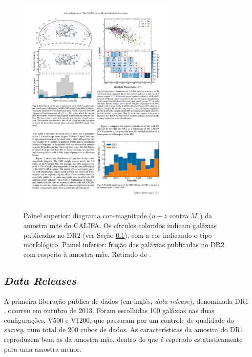 \begin{figure}
	\includegraphics[width=0.7\textwidth]{figuras/CALIFACMD}
	\caption[Diagrama cor--magnitude da amostra mãe do CALIFA]
	{Painel superior: diagrama cor--magnitude ($u-z$ contra $M_z$) da amostra mãe
	do CALIFA. Os círculos coloridos indicam galáxias publicadas no DR2 (ver Seção
	\ref{sec:ifs:dr}), com a cor indicando o tipo morfológico. Painel inferior:
	fração das galáxias publicadas no DR2 com respeito à amostra mãe. Retirado de
	\citet{GarciaBenito2015}.}
	\label{fig:CALIFACMD}
\end{figure}


\subsection{{\em Data Releases}}
\label{sec:ifs:dr}

A primeira liberação pública de dados (em inglês, {\em data release}),
denominada DR1 \citep{Husemann2013}, ocorreu em outubro de 2013. Foram
escolhidas 100 galáxias nas duas configurações, V500 e V1200, que passaram por
um controle de qualidade do {\em survey}, num total de 200 cubos de dados. As
características da amostra do DR1 reproduzem bem as da amostra mãe, dentro do
que é esperado estatisticamente para uma amostra menor.

